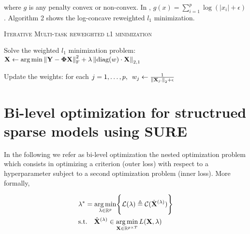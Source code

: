 \documentclass[a4paper,10pt]{article}
\theoremstyle{definition}
\begin{document}
where $g$ is any penalty convex or non-convex. In \cite{Candes_Wakin_Boyd08}, $g(x) = \sum_{i=1}^p \log(\lvert x_i \rvert + \epsilon)$. Algorithm 2 shows the log-concave reweighted $l_1$ minimization.

\vskip 0.2in

{\fontsize{4}{4}\selectfont
\begin{algorithm}[h]  %
\caption{\textsc{Iterative Multi-task reweighted l1 minimization}
}
%

    {
        Solve the weighted $l_1$ minimization problem:
        $\mathbf{X} \leftarrow \operatorname*{arg\,min} \left \lVert \mathbf{Y} -  \mathbf{\Phi} \mathbf{X} \right \rVert_{\text{F}}^2 + \lambda \left \lVert \text{diag}(w) \cdot \mathbf{X} \right \rVert_{2, 1}$

        Update the weights: for each
        $j = 1, \dots, p, \enspace w_j \leftarrow \frac{1}{\left \lVert \mathbf{X}_{j:} \right \rVert_2 + \epsilon}$
    }

\end{algorithm}
}

\newpage

\section{Bi-level optimization for structrued sparse models using SURE}
\label{section_6}

In the following we refer as bi-level optimization the nested optimization problem
which consists in optimizing a criterion (outer loss) with respect to a hyperparameter subject to
a second optimization problem (inner loss). More formally,

\begin{align*}
    &\lambda^* = \operatorname*{arg\,min}_{\lambda \in \mathbb{R}^p} \Biggl\{\mathcal{L}(\lambda) \triangleq \mathcal{C}(\hat{\mathbf{X}}^{(\lambda)})\Biggr\} \\
    &\text{s.t.} \quad \hat{\mathbf{X}}^{(\lambda)} \in \operatorname*{arg\,min}_{\mathbf{X} \in \mathbb{R}^{p\times T}} L(\mathbf{X}, \lambda)
\end{align*}
\end{document}
